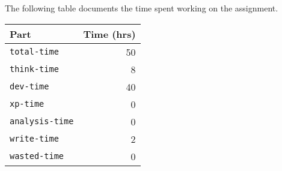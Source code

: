 \documentclass{acm_proc_article-sp}
\begin{document}
The following table documents the time spent working on the assignment.

\begin{tabular}{ | l | r | }
	\hline
	Part & Time (hrs) \\ \hline \hline
	\texttt{total-time} & 50\\ \hline
	\texttt{think-time} & 8\\ \hline
	\texttt{dev-time} & 40\\ \hline
	\texttt{xp-time} & 0\\ \hline
	\texttt{analysis-time} & 0\\ \hline
	\texttt{write-time} & 2\\ \hline
	\texttt{wasted-time} & 0\\ \hline
\end{tabular}
\end{document}
